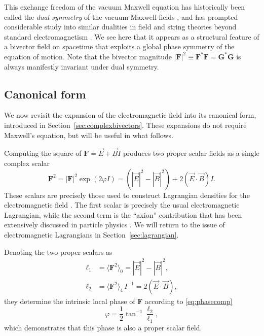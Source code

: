 \documentclass[1p,sort&compress]{elsarticle}
\numberwithin{equation}{section}
\newcommand{\rv}[1]{\vec{#1}}
\newcommand{\bv}[1]{\mathbf{#1}}
\newcommand{\mean}[1]{\langle #1 \rangle}
\begin{document}
This exchange freedom of the vacuum Maxwell equation \cite{Heaviside1892,Larmor1897} has historically been called the \emph{dual symmetry} of the vacuum Maxwell fields \cite{Calkin1965,Zwanziger1968,Deser1976,Cameron2012b,Bliokh2013,Cameron2012,Fernandez2012,Fernandez2013}, and has prompted considerable study into similar dualities in field and string theories beyond standard electromagnetism \cite{Born1934,Schrodinger1935,Ferrara1977,Gaillard1981,Sen1993,Schwarz1994,Pasti1995b,Gibbons1995,Hull1995,Deser1998,Cremmer1998,Figueroa-O'Farrill,Aschieri2008,Aschieri2014}.  We see here that it appears as a structural feature of a bivector field on spacetime that exploits a global phase symmetry of the equation of motion.  Note that the bivector magnitude $|\bv{F}|^2 \equiv \bv{F}^* \bv{F} = \bv{G}^*\bv{G}$ is always manifestly invariant under dual symmetry.


\subsection{Canonical form}\label{sec:canonical}


We now revisit the expansion of the electromagnetic field into its canonical form, introduced in Section~\ref{sec:complexbivectors}.  These expansions do not require Maxwell's equation, but will be useful in what follows.  

Computing the square of $\bv{F} = \rv{E} + \rv{B}I$ produces two proper scalar fields as a single complex scalar
\begin{equation}\label{eq:lorentzscalars}
  \bv{F}^2 = |\bv{F}|^2 \exp(2\varphi I) = (|\rv{E}|^2 - |\rv{B}|^2) + 2(\rv{E}\cdot\rv{B})I.
\end{equation}
These scalars are precisely those used to construct Lagrangian densities for the electromagnetic field \cite{Battesti2013}.  The first scalar is precisely the usual electromagnetic Lagrangian, while the second term is the ``axion'' contribution that has been extensively discussed in particle physics \cite{Weinberg1978}.  We will return to the issue of electromagnetic Lagrangians in Section~\ref{sec:lagrangian}.

Denoting the two proper scalars as 
\begin{align}
  \ell_1 &= \mean{\bv{F}^2}_0 = |\rv{E}|^2 - |\rv{B}|^2, \\
  \ell_2 &= \mean{\bv{F}^2}_4\, I^{-1} = 2(\rv{E}\cdot\rv{B}),
\end{align}
they determine the intrinsic local phase of $\bv{F}$ according to \eqref{eq:phasecomp}
\begin{equation}
  \varphi = \frac{1}{2}\tan^{-1}\frac{\ell_2}{\ell_1},
\end{equation}
which demonstrates that this phase is also a proper scalar field.
\end{document}
